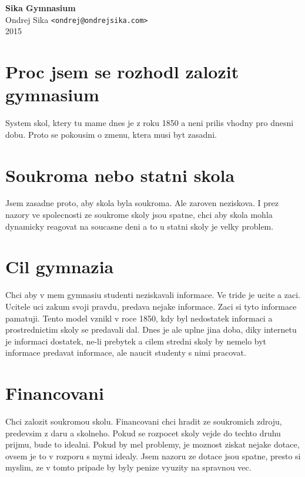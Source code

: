 \documentclass[12pt,a4paper]{article}
\begin{document}

\begin{center}
{\LARGE \bf Sika Gymnasium}\\
\vspace*{0.4cm}
{\large Ondrej Sika {\tt <ondrej@ondrejsika.com>}}\\
\vspace*{0.3cm}
2015\\
\end{center}


\section*{Proc jsem se rozhodl zalozit gymnasium}

System skol, ktery tu mame dnes je z roku 1850 a neni prilis vhodny pro dnesni dobu. Proto se pokousim o zmenu, ktera musi byt zasadni.


\section*{Soukroma nebo statni skola}

Jsem zasadne proto, aby skola byla soukroma. Ale zaroven neziskova. I prez nazory ve spolecnosti ze soukrome skoly jsou spatne, chci aby skola mohla dynamicky reagovat na soucasne deni a to u statni skoly je velky problem.


\section*{Cil gymnazia}

Chci aby v mem gymnasiu studenti neziskavali informace. Ve tride je ucite a zaci. Ucitele uci zakum svoji pravdu, predava nejake informace. Zaci si tyto informace pamatuji. Tento model vznikl v roce 1850, kdy byl nedostatek informaci a prostrednictim skoly se predavali dal. Dnes je ale uplne jina doba, diky internetu je informaci dostatek, ne-li prebytek a cilem stredni skoly by nemelo byt informace predavat informace, ale naucit studenty s nimi pracovat.


\section*{Financovani}

Chci zalozit soukromou skolu. Financovani chci hradit ze soukromich zdroju, predevsim z daru a skolneho. Pokud se rozpocet skoly vejde do techto druhu prijmu, bude to idealni. Pokud by mel problemy, je moznost ziskat nejake dotace, ovsem je to v rozporu s mymi idealy. Jsem nazoru ze dotace jsou spatne, presto si myslim, ze v tomto pripade by byly penize vyuzity na spravnou vec.
\end{document}
